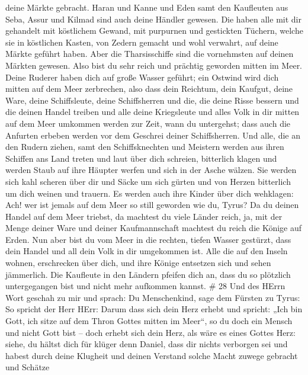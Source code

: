 deine Märkte gebracht.  Haran und Kanne und Eden samt den
Kaufleuten aus Seba, Assur und Kilmad sind auch deine Händler gewesen.
 Die haben alle mit dir gehandelt mit köstlichem Gewand,
mit purpurnen und gestickten Tüchern, welche sie in köstlichen Kasten,
von Zedern gemacht und wohl verwahrt, auf deine Märkte geführt haben.
 Aber die Tharsisschiffe sind die vornehmsten auf deinen
Märkten gewesen. Also bist du sehr reich und prächtig geworden mitten im
Meer.  Deine Ruderer haben dich auf große Wasser geführt;
ein Ostwind wird dich mitten auf dem Meer zerbrechen,  also
dass dein Reichtum, dein Kaufgut, deine Ware, deine Schiffsleute, deine
Schiffsherren und die, die deine Risse bessern und die deinen Handel
treiben und alle deine Kriegsleute und alles Volk in dir mitten auf dem
Meer umkommen werden zur Zeit, wann du untergehst;  dass
auch die Anfurten erbeben werden vor dem Geschrei deiner Schiffsherren.
 Und alle, die an den Rudern ziehen, samt den
Schiffsknechten und Meistern werden aus ihren Schiffen ans Land treten
 und laut über dich schreien, bitterlich klagen und werden
Staub auf ihre Häupter werfen und sich in der Asche wälzen.
 Sie werden sich kahl scheren über dir und Säcke um sich
gürten und von Herzen bitterlich um dich weinen und trauern.
 Es werden auch ihre Kinder über dich wehklagen: Ach! wer
ist jemals auf dem Meer so still geworden wie du, Tyrus? 
Da du deinen Handel auf dem Meer triebst, da machtest du viele Länder
reich, ja, mit der Menge deiner Ware und deiner Kaufmannschaft machtest
du reich die Könige auf Erden.  Nun aber bist du vom Meer
in die rechten, tiefen Wasser gestürzt, dass dein Handel und all dein
Volk in dir umgekommen ist.  Alle die auf den Inseln
wohnen, erschrecken über dich, und ihre Könige entsetzen sich und sehen
jämmerlich.  Die Kaufleute in den Ländern pfeifen dich an,
dass du so plötzlich untergegangen bist und nicht mehr aufkommen kannst.
\# 28  Und des HErrn Wort geschah zu mir und sprach:
 Du Menschenkind, sage dem Fürsten zu Tyrus: So spricht der
Herr HErr: Darum dass sich dein Herz erhebt und spricht: „Ich bin Gott,
ich sitze auf dem Thron Gottes mitten im Meer``, so du doch ein Mensch
und nicht Gott bist -- doch erhebt sich dein Herz, als wäre es eines
Gottes Herz:  siehe, du hältst dich für klüger denn Daniel,
dass dir nichts verborgen sei  und habest durch deine
Klugheit und deinen Verstand solche Macht zuwege gebracht und Schätze
